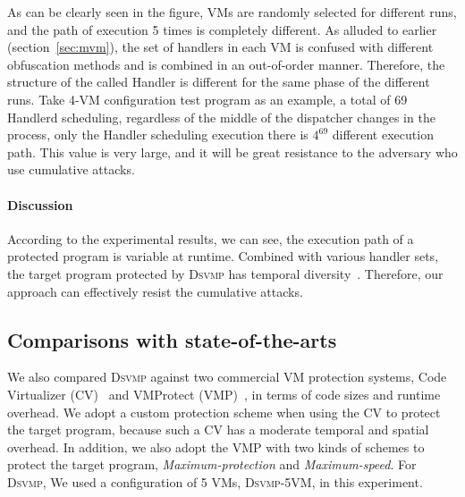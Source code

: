 \documentclass[preprint,12pt,3p]{elsarticle}
\newcommand{\DSVMP}{\textsc{Dsvmp}\xspace}
\begin{document}
As can be clearly seen in the figure, VMs are randomly selected for different runs,
and the path of execution 5 times is completely different. As alluded to earlier (section~\ref{sec:mvm}),
the set of handlers in each VM is confused with different obfuscation methods and is combined in an out-of-order manner.
Therefore, the structure of the called Handler is different for the same phase of the different runs.
Take 4-VM configuration test program as an example, a total of 69 Handlerd scheduling,
regardless of the middle of the dispatcher changes in the process,
only the Handler scheduling execution there is $4^{69}$ different execution path.
This value is very large, and it will be great resistance to the adversary who use cumulative attacks.

\paragraph*{Discussion}
According to the experimental results, we can see, the execution path of a protected program is variable at runtime.
Combined with various handler sets, the target program protected by \DSVMP has temporal diversity~\cite{4collberg}.
Therefore, our approach can effectively resist the cumulative attacks.






\subsection{Comparisons with state-of-the-arts}\label{sec:comparetest}
We also compared \DSVMP against two commercial VM protection systems,
Code Virtualizer (CV)~\cite{2CV} and VMProtect (VMP)~\cite{3Vmprotect}, in terms of code sizes and runtime overhead.
We adopt a custom protection scheme when using the CV to protect the target program,
because such a CV has a moderate temporal and spatial overhead.
In addition, we also adopt the VMP with two kinds of schemes to protect the target program,
\emph{Maximum-protection} and \emph{Maximum-speed}.
For \DSVMP, We used a configuration of 5 VMs, \DSVMP-5VM, in this experiment.
\end{document}
